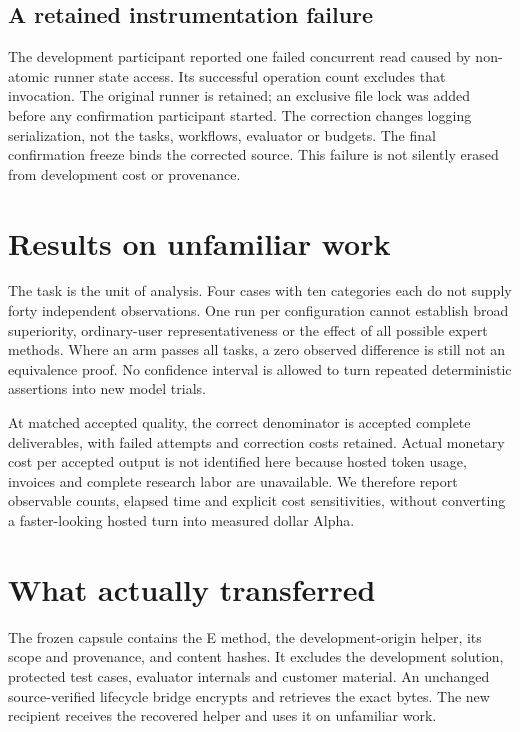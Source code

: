 \documentclass[11pt,letterpaper]{article}
\begin{document}
\subsection{A retained instrumentation failure}
The development participant reported one failed concurrent read caused by non-atomic runner state access. Its successful operation count excludes that invocation. The original runner is retained; an exclusive file lock was added before any confirmation participant started. The correction changes logging serialization, not the tasks, workflows, evaluator or budgets. The final confirmation freeze binds the corrected source. This failure is not silently erased from development cost or provenance.

\section{Results on unfamiliar work}


The task is the unit of analysis. Four cases with ten categories each do not supply forty independent observations. One run per configuration cannot establish broad superiority, ordinary-user representativeness or the effect of all possible expert methods. Where an arm passes all tasks, a zero observed difference is still not an equivalence proof. No confidence interval is allowed to turn repeated deterministic assertions into new model trials.

At matched accepted quality, the correct denominator is accepted complete deliverables, with failed attempts and correction costs retained. Actual monetary cost per accepted output is not identified here because hosted token usage, invoices and complete research labor are unavailable. We therefore report observable counts, elapsed time and explicit cost sensitivities, without converting a faster-looking hosted turn into measured dollar Alpha.

\section{What actually transferred}
The frozen capsule contains the E method, the development-origin helper, its scope and provenance, and content hashes. It excludes the development solution, protected test cases, evaluator internals and customer material. An unchanged source-verified lifecycle bridge encrypts and retrieves the exact bytes. The new recipient receives the recovered helper and uses it on unfamiliar work.
\end{document}

